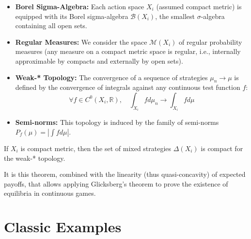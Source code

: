 \begin{itemize}
    \item \textbf{Borel Sigma-Algebra:} Each action space $X_i$ (assumed compact metric) is equipped with its Borel sigma-algebra $\mathcal{B}(X_i)$, the smallest $\sigma$-algebra containing all open sets.
    \item \textbf{Regular Measures:} We consider the space $\mathcal{M}(X_i)$ of regular probability measures (any measure on a compact metric space is regular, i.e., internally approximable by compacts and externally by open sets).
    \item \textbf{Weak-* Topology:} The convergence of a sequence of strategies $\mu_n \to \mu$ is defined by the convergence of integrals against any continuous test function $f$:
    $$\forall f \in C^0(X_i, \mathbb{R}), \quad \int_{X_i} f d\mu_n \to \int_{X_i} f d\mu$$
    \item \textbf{Semi-norms:} This topology is induced by the family of semi-norms $P_f(\mu) = |\int f d\mu|$.
\end{itemize}

\begin{theoreme}
If $X_i$ is compact metric, then the set of mixed strategies $\Delta(X_i)$ is compact for the weak-* topology.
\end{theoreme}
It is this theorem, combined with the linearity (thus quasi-concavity) of expected payoffs, that allows applying Glicksberg's theorem to prove the existence of equilibria in continuous games.

\section{Classic Examples}

